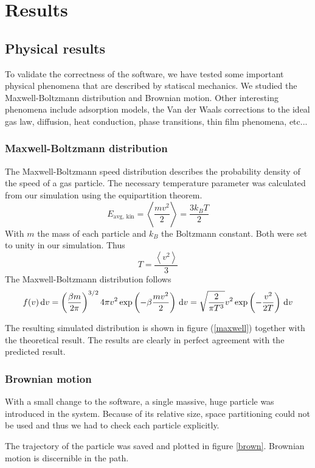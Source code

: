 \section{Results}
\subsection{Physical results}

To validate the correctness of the software, we have tested some important 
physical phenomena that are described by statiscal mechanics. We studied the 
Maxwell-Boltzmann distribution and Brownian motion. Other interesting phenomena 
include adsorption models, the Van der Waals corrections to the ideal gas law, 
diffusion, heat conduction, phase transitions, thin film phenomena, etc...

\subsubsection{Maxwell-Boltzmann distribution}
The Maxwell-Boltzmann speed distribution describes the probability density of 
the speed of a gas particle. The necessary temperature parameter was calculated 
from our simulation using the equipartition theorem.
$$
E_{\textrm{avg, kin}} = \left< \frac{mv^2}{2} \right> = \frac{3k_BT}{2}
$$
With $m$ the mass of each particle and $k_B$ the Boltzmann constant. Both were 
set to unity in our simulation. Thus
$$
T = \frac{\left< v^2 \right>}{3}
$$
The Maxwell-Boltzmann distribution follows
$$
f(v)\,\mathrm d v = \left( \frac{\beta m}{2 \pi} \right)^{3/2} 4 \pi v^2
\exp\left( -\beta \frac{mv^2}{2}\right) \,\mathrm d v =
\sqrt{ \frac{2}{\pi T^3} } v^2 \exp \left(-\frac{v^2}{2T}\right) \,\mathrm d v
$$

The resulting simulated distribution is shown in figure (\ref{maxwell}) 
together with the theoretical result. The results are clearly in perfect 
agreement with the predicted result.

\subsubsection{Brownian motion}
With a small change to the software, a single massive, huge particle was 
introduced in the system. Because of its relative size, space partitioning 
could not be used and thus we had to check each particle explicitly. 


The trajectory of the particle was saved and plotted in figure \ref{brown}.  
Brownian motion is discernible in the path.



